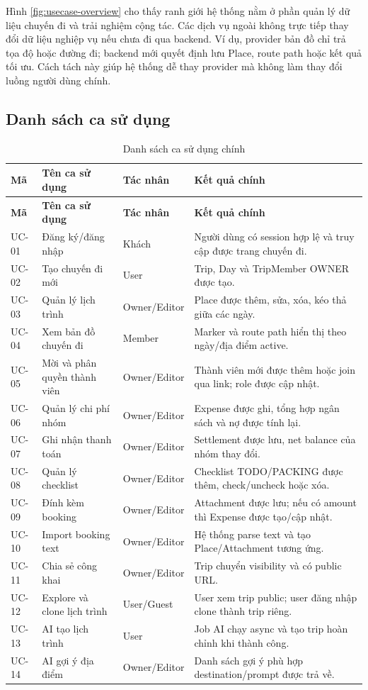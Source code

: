 \documentclass[a4paper]{report}
\begin{document}
Hình \ref{fig:usecase-overview} cho thấy ranh giới hệ thống nằm ở phần quản lý dữ liệu chuyến đi và trải nghiệm cộng tác. Các dịch vụ ngoài không trực tiếp thay đổi dữ liệu nghiệp vụ nếu chưa đi qua backend. Ví dụ, provider bản đồ chỉ trả tọa độ hoặc đường đi; backend mới quyết định lưu Place, route path hoặc kết quả tối ưu. Cách tách này giúp hệ thống dễ thay provider mà không làm thay đổi luồng người dùng chính.

\subsection{Danh sách ca sử dụng}

\begin{longtable}{|C{1.6cm}|P{4.4cm}|P{3.2cm}|P{6.1cm}|}
\caption{Danh sách ca sử dụng chính}\\
\hline
\textbf{Mã} & \textbf{Tên ca sử dụng} & \textbf{Tác nhân} & \textbf{Kết quả chính}\\
\hline
\endfirsthead
\hline
\textbf{Mã} & \textbf{Tên ca sử dụng} & \textbf{Tác nhân} & \textbf{Kết quả chính}\\
\hline
\endhead
UC-01 & Đăng ký/đăng nhập & Khách & Người dùng có session hợp lệ và truy cập được trang chuyến đi.\\
\hline
UC-02 & Tạo chuyến đi mới & User & Trip, Day và TripMember OWNER được tạo.\\
\hline
UC-03 & Quản lý lịch trình & Owner/Editor & Place được thêm, sửa, xóa, kéo thả giữa các ngày.\\
\hline
UC-04 & Xem bản đồ chuyến đi & Member & Marker và route path hiển thị theo ngày/địa điểm active.\\
\hline
UC-05 & Mời và phân quyền thành viên & Owner/Editor & Thành viên mới được thêm hoặc join qua link; role được cập nhật.\\
\hline
UC-06 & Quản lý chi phí nhóm & Owner/Editor & Expense được ghi, tổng hợp ngân sách và nợ được tính lại.\\
\hline
UC-07 & Ghi nhận thanh toán & Owner/Editor & Settlement được lưu, net balance của nhóm thay đổi.\\
\hline
UC-08 & Quản lý checklist & Owner/Editor & Checklist TODO/PACKING được thêm, check/uncheck hoặc xóa.\\
\hline
UC-09 & Đính kèm booking & Owner/Editor & Attachment được lưu; nếu có amount thì Expense được tạo/cập nhật.\\
\hline
UC-10 & Import booking text & Owner/Editor & Hệ thống parse text và tạo Place/Attachment tương ứng.\\
\hline
UC-11 & Chia sẻ công khai & Owner/Editor & Trip chuyển visibility và có public URL.\\
\hline
UC-12 & Explore và clone lịch trình & User/Guest & User xem trip public; user đăng nhập clone thành trip riêng.\\
\hline
UC-13 & AI tạo lịch trình & User & Job AI chạy async và tạo trip hoàn chỉnh khi thành công.\\
\hline
UC-14 & AI gợi ý địa điểm & Owner/Editor & Danh sách gợi ý phù hợp destination/prompt được trả về.\\
\hline
\end{longtable}
\end{document}
